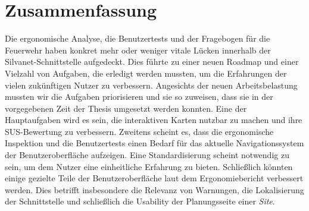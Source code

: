 \section{Zusammenfassung}

Die ergonomische Analyse, die Benutzertests und der Fragebogen für die Feuerwehr haben konkret mehr oder weniger vitale Lücken innerhalb der Silvanet-Schnittstelle aufgedeckt.
Dies führte zu einer neuen Roadmap und einer Vielzahl von Aufgaben, die erledigt werden mussten, um die Erfahrungen der vielen zukünftigen Nutzer zu verbessern.
Angesichts der neuen Arbeitsbelastung mussten wir die Aufgaben priorisieren und sie so zuweisen, dass sie in der vorgegebenen Zeit der Thesis umgesetzt werden konnten.
Eine der Hauptaufgaben wird es sein, die interaktiven Karten nutzbar zu machen und ihre \ac{SUS}-Bewertung zu verbessern.
Zweitens scheint es, dass die ergonomische Inspektion und die Benutzertests einen Bedarf für das aktuelle Navigationssystem der Benutzeroberfläche aufzeigen.
Eine Standardisierung scheint notwendig zu sein, um dem Nutzer eine einheitliche Erfahrung zu bieten.
Schließlich könnten einige gezielte Teile der Benutzeroberfläche laut dem Ergonomiebericht verbessert werden.
Dies betrifft insbesondere die Relevanz von Warnungen, die Lokalisierung der Schnittstelle und schließlich die Usability der Planungsseite einer \textit{Site}.